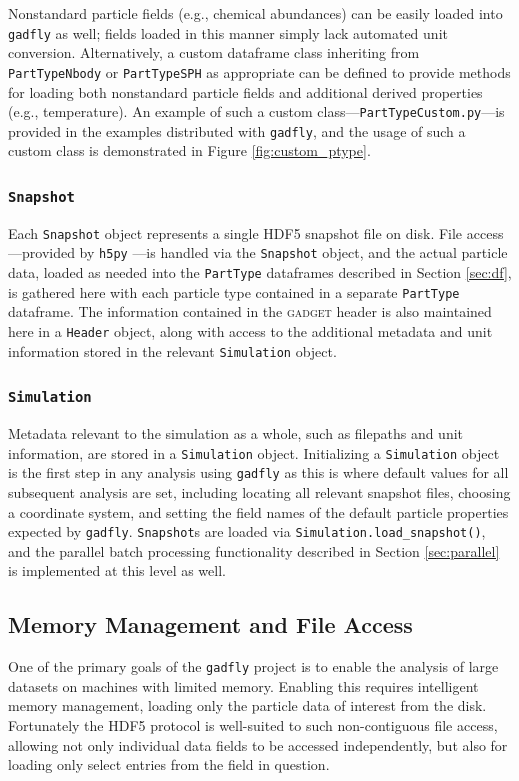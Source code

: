 \documentclass{emulateapj}
\newcommand{\code}[1]{\texttt{#1}}
\begin{document}
Nonstandard particle fields (e.g., chemical abundances) can be easily loaded into \code{gadfly} as well; fields loaded in this manner simply lack automated unit conversion.
Alternatively, a custom dataframe class inheriting from \code{PartTypeNbody} or \code{PartTypeSPH} as appropriate can be defined to provide methods for loading both nonstandard particle fields and additional derived properties (e.g., temperature). An example of such a custom class---\code{PartTypeCustom.py}---is provided in the examples distributed with \code{gadfly}, and the usage of such a custom class is demonstrated in Figure \ref{fig:custom_ptype}.

\subsubsection{\code{Snapshot}}
\label{sec:snap}
Each \code{Snapshot} object represents a single HDF5 snapshot file on disk.  File access---provided by \code{h5py} \citep{h5py}---is handled via the \code{Snapshot} object, and the actual particle data, loaded as needed into the \code{PartType} dataframes described in Section \ref{sec:df}, is gathered here with each particle type contained in a separate \code{PartType} dataframe.  
The information contained in the \textsc{gadget} header is also maintained here in a \code{Header} object, along with access to the additional metadata and unit information stored in the relevant \code{Simulation} object.

\subsubsection{\code{Simulation}}
\label{sec:sim}
Metadata relevant to the simulation as a whole, such as filepaths and unit information, are stored in a \code{Simulation} object.  Initializing a \code{Simulation} object is the first step in any analysis using \code{gadfly} as this is where default values for all subsequent analysis are set, including locating all relevant snapshot files, choosing a coordinate system, and setting the field names of the default particle properties expected by \code{gadfly}.  \code{Snapshot}s are loaded via \verb|Simulation.load_snapshot()|, and the parallel batch processing functionality described in Section \ref{sec:parallel} is implemented at this level as well.

\subsection{Memory Management and File Access}
\label{sec:fileIO}
One of the primary goals of the \code{gadfly} project is to enable the analysis of large datasets on machines with limited memory.
Enabling this requires intelligent memory management, loading only the particle data of interest from the disk.
Fortunately the HDF5 protocol is well-suited to such non-contiguous file access, allowing not only individual data fields to be accessed independently, but also for  loading only select entries from the field in question.
\end{document}
